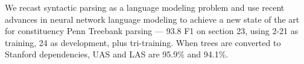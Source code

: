 We recast syntactic parsing as a language modeling problem and use recent advances in neural network language modeling to achieve a new state of the art for constituency Penn Treebank parsing --- 93.8 F1 on section 23, using 2-21 as training, 24 as development, plus tri-training. When trees are converted to Stanford dependencies, UAS and LAS are 95.9\% and 94.1\%.
